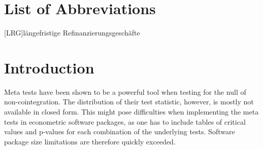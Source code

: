 \documentclass[12pt,a4paper]{article}
\begin{document}


{
\hypersetup{linkcolor=black}

\setcounter{tocdepth}{3}
\tableofcontents
}

\newpage
\listoffigures
{}

\listoftables
{}

\section*{List of Abbreviations}

\begin{adjustwidth}{1.5em}{0pt}

\begin{acronym}[dummyyyy]
 [LRG]{längefristige Refinanzierungsgeschäfte}

\end{acronym}

\end{adjustwidth}

\restoregeometry

\newpage
{} %

\hypertarget{introduction}{%
\section{Introduction}\label{introduction}}

Meta tests have been shown to be a powerful tool when testing for the
null of non-cointegration. The distribution of their test statistic,
however, is mostly not available in closed form. This might pose
difficulties when implementing the meta tests in econometric software
packages, as one has to include tables of critical values and p-values
for each combination of the underlying tests. Software package size
limitations are therefore quickly exceeded.
\end{document}
